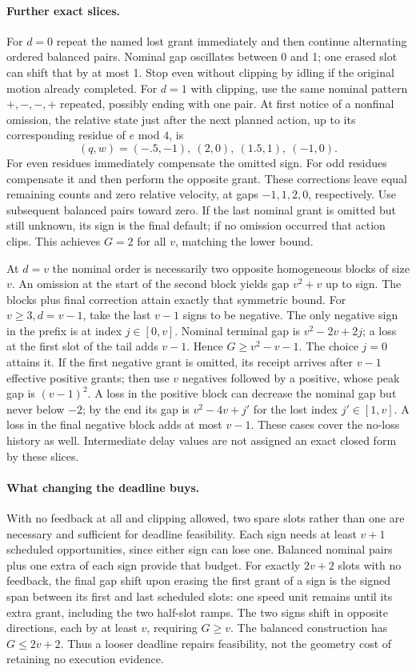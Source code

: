 \documentclass{article}
\begin{document}
\paragraph{Further exact slices.}
For \(d=0\) repeat the named lost grant immediately
and then continue alternating ordered balanced pairs.
Nominal gap oscillates between 0 and 1; one erased slot
can shift that by at most 1. Stop even without clipping
by idling if the original motion already completed.
For \(d=1\) with clipping, use the same nominal pattern
\(+, -,-,+\) repeated, possibly ending with one pair.
At first notice of a nonfinal omission, the relative
state just after the next planned action, up to its
corresponding residue of \(e\) mod \(4\), is
\[
(q,w)=(-.5,-1),\ (2,0),\ (1.5,1),\ (-1,0).
\]
For even residues immediately compensate the omitted sign.
For odd residues compensate it and then perform the
opposite grant. These corrections leave equal remaining
counts and zero relative velocity, at gaps \(-1,1,2,0\),
respectively. Use subsequent balanced pairs toward zero.
If the last nominal grant is omitted but still unknown,
its sign is the final default; if no omission occurred
that action clips. This achieves \(G=2\) for all \(v\),
matching the lower bound.

At \(d=v\) the nominal order is necessarily two
opposite homogeneous blocks of size \(v\).
An omission at the start of the second block yields
gap \(v^2+v\) up to sign. The blocks plus final correction
attain exactly that symmetric bound. For \(v\ge3,d=v-1\),
take the last \(v-1\) signs to be negative. The only
negative sign in the prefix is at index \(j\in[0,v]\).
Nominal terminal gap is \(v^2-2v+2j\); a loss at
the first slot of the tail adds \(v-1\). Hence
\(G\ge v^2-v-1\). The choice \(j=0\) attains it.
If the first negative grant is omitted, its receipt
arrives after \(v-1\) effective positive grants;
then use \(v\) negatives followed by a positive, whose
peak gap is \((v-1)^2\).
A loss in the positive block can decrease the nominal
gap but never below \(-2\); by the end its gap is
\(v^2-4v+j'\) for the lost index \(j'\in[1,v]\).
A loss in the final negative block adds at most \(v-1\).
These cases cover the no-loss history as well.
Intermediate delay values are not assigned an exact
closed form by these slices.

\paragraph{What changing the deadline buys.}
With no feedback at all and clipping allowed, two spare slots
rather than one are necessary and sufficient for deadline
feasibility. Each sign needs at least \(v+1\) scheduled
opportunities, since either sign can lose one. Balanced
nominal pairs plus one extra of each sign provide that budget.
For exactly \(2v+2\) slots with no feedback, the final
gap shift upon erasing the first grant of a sign is the
signed span between its first and last scheduled slots:
one speed unit remains until its extra grant, including the
two half-slot ramps. The two signs shift in opposite
directions, each by at least \(v\), requiring \(G\ge v\).
The balanced construction has \(G\le2v+2\).
Thus a looser deadline repairs feasibility, not the
geometry cost of retaining no execution evidence.
\end{document}
